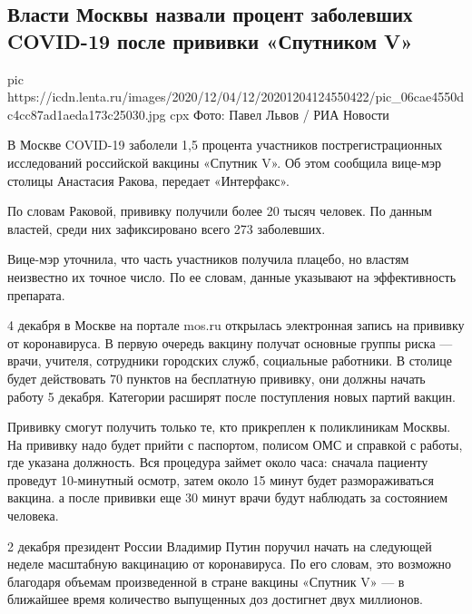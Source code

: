  
 
 
 
 
 
\subsection{Власти Москвы назвали процент заболевших COVID-19 после прививки «Спутником V»}
\label{sec:04_12_2020.news.ru.lenta_ru.3.vaccine_sputnik_v_stats}


\ifcmt
pic https://icdn.lenta.ru/images/2020/12/04/12/20201204124550422/pic_06cae4550dc4cc87ad1aeda173c25030.jpg
cpx Фото: Павел Львов / РИА Новости
\fi

В Москве COVID-19 заболели 1,5 процента участников пострегистрационных
исследований российской вакцины «Спутник V». Об этом сообщила вице-мэр столицы
Анастасия Ракова, передает «Интерфакс».

По словам Раковой, прививку получили более 20 тысяч человек. По данным властей,
среди них зафиксировано всего 273 заболевших.

Вице-мэр уточнила, что часть участников получила плацебо, но властям неизвестно
их точное число. По ее словам, данные указывают на эффективность препарата.

4 декабря в Москве на портале mos.ru открылась электронная запись на прививку
от коронавируса. В первую очередь вакцину получат основные группы риска —
врачи, учителя, сотрудники городских служб, социальные работники. В столице
будет действовать 70 пунктов на бесплатную прививку, они должны начать работу 5
декабря. Категории расширят после поступления новых партий вакцин.

Прививку смогут получить только те, кто прикреплен к поликлиникам Москвы. На
прививку надо будет прийти с паспортом, полисом ОМС и справкой с работы, где
указана должность. Вся процедура займет около часа: сначала пациенту проведут
10-минутный осмотр, затем около 15 минут будет размораживаться вакцина. а после
прививки еще 30 минут врачи будут наблюдать за состоянием человека.

2 декабря президент России Владимир Путин поручил начать на следующей неделе
масштабную вакцинацию от коронавируса. По его словам, это возможно благодаря
объемам произведенной в стране вакцины «Спутник V» — в ближайшее время
количество выпущенных доз достигнет двух миллионов.

